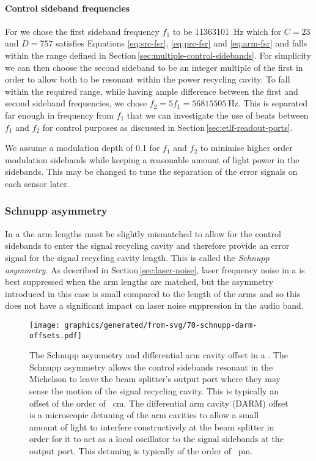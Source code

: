 \paragraph{Control sideband frequencies}
For \ETLF{} we chose the first sideband frequency $f_1$ to be \SI{11363101}{\hertz} which for $C = 23$ and $D = 757$ satisfies Equations \ref{eq:src-fsr}, \ref{eq:prc-fsr} and \ref{eq:arm-fsr} and falls within the range defined in Section\,\ref{sec:multiple-control-sidebands}. For simplicity we can then choose the second sideband to be an integer multiple of the first in order to allow both to be resonant within the power recycling cavity. To fall within the required range, while having ample difference between the first and second sideband frequencies, we chose $f_2 = 5f_1 = \SI{56815505}{\hertz}$. This is separated far enough in frequency from $f_1$ that we can investigate the use of beats between $f_1$ and $f_2$ for control purposes as discussed in Section\,\ref{sec:etlf-readout-ports}.

We assume a modulation depth of \num{0.1} for $f_1$ and $f_2$ to minimise higher order modulation sidebands while keeping a reasonable amount of light power in the sidebands. This may be changed to tune the separation of the error signals on each sensor later.

\subsubsection{Schnupp asymmetry}
In a \DRFPMI{} the arm lengths must be slightly mismatched to allow for the control sidebands to enter the signal recycling cavity and therefore provide an error signal for the signal recycling cavity length. This is called the \emph{Schnupp asymmetry}. As described in Section\,\ref{sec:laser-noise}, laser frequency noise in a \MI{} is best suppressed when the arm lengths are matched, but the asymmetry introduced in this case is small compared to the length of the arms and so this does not have a significant impact on laser noise suppression in the audio band.

\begin{figure}
  \centering
  \texttt{[image: graphics/generated/from-svg/70-schnupp-darm-offsets.pdf]}
  \caption[Schnupp asymmetry and differential arm cavity offset in a \DRFPMI{}]{\label{fig:schnupp-darm-offsets}The Schnupp asymmetry and differential arm cavity offset in a \DRFPMI{}. The Schnupp asymmetry allows the control sidebands resonant in the Michelson to leave the beam splitter's output port where they may sense the motion of the signal recycling cavity. This is typically an offset of the order of \SI{}{\centi\meter}. The differential arm cavity (\gls{DARM}) offset is a microscopic detuning of the arm cavities to allow a small amount of light to interfere constructively at the beam splitter in order for it to act as a local oscillator to the signal sidebands at the output port. This detuning is typically of the order of \SI{}{\pico\meter}.}
\end{figure}

